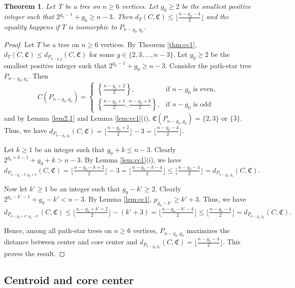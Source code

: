 \documentclass[10pt,a4paper]{amsart}
\newtheorem{theorem}{Theorem}[section]
\begin{document}
\begin{theorem}\label{thm:cc2}
Let T be a tree on $n\geq 6$ vertices. Let $g_0\geq 2$ be the smallest positive integer such that $2^{g_0-1}+g_0\geq n-3$. Then  $d_T(C,\mathfrak{C})\leq \lfloor \frac{n-g_0-4}{2} \rfloor$ and the equality happens if $T$ is isomorphic to $P_{n-g_0,g_0}$.
\end{theorem}
\begin{proof}
Let $T$ be a tree on $n\geq 6$ vertices. By Theorem \ref{thm:cc1}, $d_T(C,\mathfrak{C})\leq d_{P_{n-g,g}}(C,\mathfrak{C})$ for some $g\in \{2,3,\ldots,n-3\}$.  
Let $g_0\geq 2$ be the smallest positive integer such that $2^{g_0-1}+g_0\geq n-3$. Consider the path-star tree $P_{n-g_0,g_0}$. Then 
\begin{equation*}
C(P_{n - g_0, g_0}) =
\begin{cases}
\left\{\frac{n - g_0 + 2}{2}\right\}, &\text{if $n - g_0$ is even,}\\
\left\{\frac{n - g_0 + 1}{2}, \frac{n - g_0 + 3}{2}\right\}, &\text{if $n - g_0$ is odd}
\end{cases}
\end{equation*}
 and by Lemma \ref{lem2.1} and Lemma \ref{lem:cc1}(i), $\mathfrak{C}(P_{n-g_0,g_0})=\{2,3\}$ or $\{3\}$. Thus, we have  $d_{P_{n - g_0, g_0}}(C,\mathfrak{C})=\lfloor \frac{n - g_0 + 2}{2}\rfloor-3=\lfloor\frac{n - g_0 -4}{2}\rfloor$.
 
Let $k\geq 1$ be an integer such that $g_0+k\leq n-3$. Clearly $2^{g_0+k-1}+g_0+k> n-3$. By Lemma \ref{lem:cc1}(i), we have $d_{P_{n - g_0-k, g_0+k}}(C,\mathfrak{C})=\lfloor \frac{n - g_0-k + 2}{2}\rfloor-3=\lfloor\frac{n - g_0 -k-4}{2}\rfloor \leq \lfloor\frac{n - g_0 -4}{2}\rfloor= d_{P_{n - g_0, g_0}}(C,\mathfrak{C}).$

Now let $k'\geq 1$ be an integer such that $g_0-k'\geq 2$. Clearly $2^{g_0-k'-1}+g_0-k'< n-3$. By Lemma \ref{lem:cc1}, $ p_{g_0-k'}\geq k'+3$. Thus, we have $d_{P_{n - g_0+k', g_0-k'}}(C,\mathfrak{C})\leq \lfloor \frac{n - g_0+k' + 2}{2}\rfloor-(k'+3)=\lfloor\frac{n - g_0 -k'-4}{2}\rfloor \leq \lfloor\frac{n - g_0 -4}{2}\rfloor= d_{P_{n - g_0, g_0}}(C,\mathfrak{C}).$ 

Hence, among all path-star trees on $n\geq 6$ vertices, $P_{n - g_0, g_0}$ maximizes the distance between center and core center and $d_{P_{n - g_0, g_0}}(C,\mathfrak{C})= \lfloor \frac{n-g_0-4}{2} \rfloor$. This proves the result.
\end{proof}


\subsection{Centroid and core center}
\end{document}
